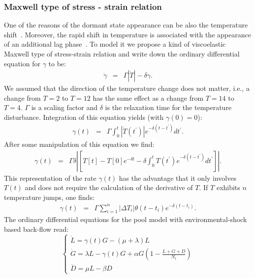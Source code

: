 \documentclass[10pt,A4paper]{article}
\begin{document}
\subsubsection{Maxwell type of stress - strain relation}
One of the reasons of the dormant state appearance can be also the temperature shift~\cite{oliver_viable_1995}.
Moreover, the rapid shift in temperature is associated with the appearance of an additional lag phase~\cite{zwietering_modeling_1994}.
To model it we propose a kind of viscoelastic Maxwell type of stress-strain relation and write down the ordinary differential equation for $\gamma$ to be:
\begin{eqnarray}
    \dot{\gamma} &=& \Gamma \left |\dot{T}\right |-\delta \gamma.
\end{eqnarray}
We assumed that the direction of the temperature change does not matter, i.e., a change from $T=2$ to $T=12$ has the same effect as a change from $T=14$ to $T=4$.
$\Gamma$ is a scaling factor and $\delta$ is the relaxation time for the temperature disturbance.
Integration of this equation yields (with $\gamma(0)=0$):
\begin{eqnarray}
    \gamma(t) &=& \Gamma \int_0^t \left |\dot{T}(t^{\prime})\right |e^{-\delta (t-t^{\prime})}dt^{\prime}.
\end{eqnarray}
After some manipulation of this equation we find:
\begin{eqnarray}
    \gamma(t) &=& \Gamma\delta\left |\left[T[t]-T[0]e^{-\delta t}-\delta \int_0^t T(t^{\prime})e^{-\delta (t-t^{\prime})}dt^{\prime}\right]\right |.
\end{eqnarray}
This representation of the rate $\gamma(t)$ has the advantage that it only involves $T(t)$ and does not require the calculation of the derivative of $T$.
If $T$ exhibits $n$ temperature jumps, one finds:
\begin{eqnarray}
    \gamma(t) &=& \Gamma\sum_{i=1}^n \left |\Delta T_i \right |\theta(t-t_i)e^{-\delta(t-t_i)}.
    \label{eq:gamma_tempshift}
\end{eqnarray}
%
The ordinary differential equations for the pool model with environmental-shock based back-flow read:
\begin{equation}
    \begin{cases}
    \dot{L} =\gamma(t) G - (\mu + \lambda) L\\
    \dot{G} = \lambda L -\gamma(t) G + \alpha G\left(1-\frac{L+G+D}{N_t}\right)\\
    \dot{D} = \mu  L - \beta D
    \label{eq:ODE_tempshift}
    \end{cases}
\end{equation}
\end{document}
